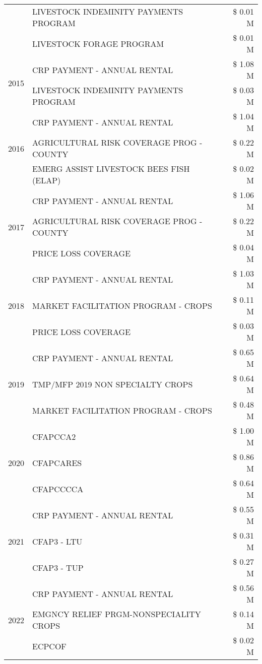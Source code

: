 \begin{tabular}{llr}
 & LIVESTOCK INDEMINITY PAYMENTS PROGRAM & \$ 0.01 M \\
 & LIVESTOCK FORAGE PROGRAM & \$ 0.01 M \\
\cline{1-3}
\multirow[t]{2}{*}{2015} & CRP PAYMENT - ANNUAL RENTAL & \$ 1.08 M \\
 & LIVESTOCK INDEMINITY PAYMENTS PROGRAM & \$ 0.03 M \\
\cline{1-3}
\multirow[t]{3}{*}{2016} & CRP PAYMENT - ANNUAL RENTAL & \$ 1.04 M \\
 & AGRICULTURAL RISK COVERAGE PROG - COUNTY & \$ 0.22 M \\
 & EMERG ASSIST LIVESTOCK BEES FISH (ELAP) & \$ 0.02 M \\
\cline{1-3}
\multirow[t]{3}{*}{2017} & CRP PAYMENT - ANNUAL RENTAL & \$ 1.06 M \\
 & AGRICULTURAL RISK COVERAGE PROG - COUNTY & \$ 0.22 M \\
 & PRICE LOSS COVERAGE & \$ 0.04 M \\
\cline{1-3}
\multirow[t]{3}{*}{2018} & CRP PAYMENT - ANNUAL RENTAL & \$ 1.03 M \\
 & MARKET FACILITATION PROGRAM - CROPS & \$ 0.11 M \\
 & PRICE LOSS COVERAGE & \$ 0.03 M \\
\cline{1-3}
\multirow[t]{3}{*}{2019} & CRP PAYMENT - ANNUAL RENTAL & \$ 0.65 M \\
 & TMP/MFP 2019 NON SPECIALTY CROPS & \$ 0.64 M \\
 & MARKET FACILITATION PROGRAM - CROPS & \$ 0.48 M \\
\cline{1-3}
\multirow[t]{3}{*}{2020} & CFAPCCA2 & \$ 1.00 M \\
 & CFAPCARES & \$ 0.86 M \\
 & CFAPCCCCA & \$ 0.64 M \\
\cline{1-3}
\multirow[t]{3}{*}{2021} & CRP PAYMENT - ANNUAL RENTAL & \$ 0.55 M \\
 & CFAP3 - LTU & \$ 0.31 M \\
 & CFAP3 - TUP & \$ 0.27 M \\
\cline{1-3}
\multirow[t]{3}{*}{2022} & CRP PAYMENT - ANNUAL RENTAL & \$ 0.56 M \\
 & EMGNCY RELIEF PRGM-NONSPECIALITY CROPS & \$ 0.14 M \\
 & ECPCOF & \$ 0.02 M \\
\cline{1-3}
\bottomrule
\end{tabular}
